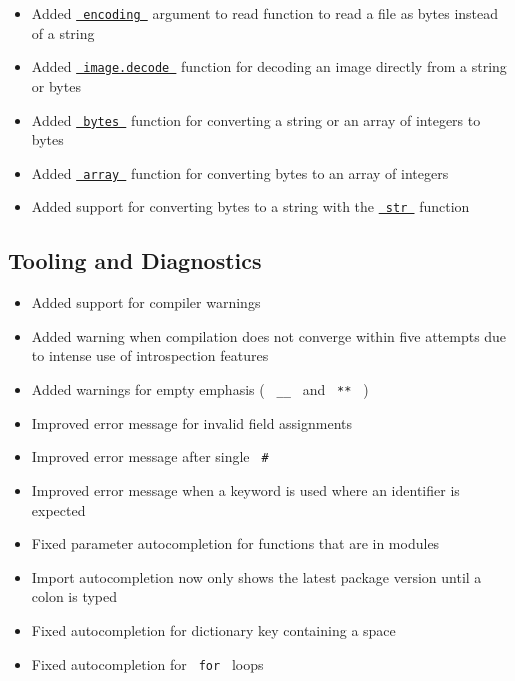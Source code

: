 \begin{itemize}
  \begin{itemize}
  \tightlist
  \item
    Added
    \href{/docs/reference/data-loading/read/\#parameters-encoding}{\texttt{\ encoding\ }}
    argument to read function to read a file as bytes instead of a
    string
  \item
    Added
    \href{/docs/reference/visualize/image/\#definitions-decode}{\texttt{\ image.decode\ }}
    function for decoding an image directly from a string or bytes
  \item
    Added \href{/docs/reference/foundations/bytes/}{\texttt{\ bytes\ }}
    function for converting a string or an array of integers to bytes
  \item
    Added \href{/docs/reference/foundations/array/}{\texttt{\ array\ }}
    function for converting bytes to an array of integers
  \item
    Added support for converting bytes to a string with the
    \href{/docs/reference/foundations/str/}{\texttt{\ str\ }} function
  \end{itemize}
\end{itemize}

\subsection{Tooling and Diagnostics}\label{tooling-and-diagnostics}

\begin{itemize}
\tightlist
\item
  Added support for compiler warnings
\item
  Added warning when compilation does not converge within five attempts
  due to intense use of introspection features
\item
  Added warnings for empty emphasis ( \texttt{\ \_\_\ } and
  \texttt{\ **\ } )
\item
  Improved error message for invalid field assignments
\item
  Improved error message after single \texttt{\ \#\ }
\item
  Improved error message when a keyword is used where an identifier is
  expected
\item
  Fixed parameter autocompletion for functions that are in modules
\item
  Import autocompletion now only shows the latest package version until
  a colon is typed
\item
  Fixed autocompletion for dictionary key containing a space
\item
  Fixed autocompletion for \texttt{\ for\ } loops
\end{itemize}

